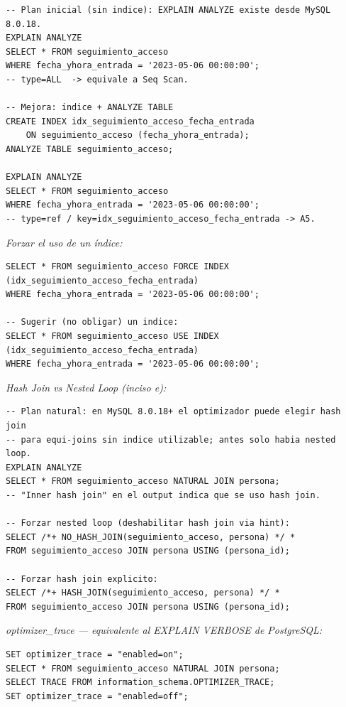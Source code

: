 \documentclass[11pt,a4paper]{article}
\begin{document}
\begin{lstlisting}
-- Plan inicial (sin indice): EXPLAIN ANALYZE existe desde MySQL 8.0.18.
EXPLAIN ANALYZE
SELECT * FROM seguimiento_acceso
WHERE fecha_yhora_entrada = '2023-05-06 00:00:00';
-- type=ALL  -> equivale a Seq Scan.

-- Mejora: indice + ANALYZE TABLE
CREATE INDEX idx_seguimiento_acceso_fecha_entrada
    ON seguimiento_acceso (fecha_yhora_entrada);
ANALYZE TABLE seguimiento_acceso;

EXPLAIN ANALYZE
SELECT * FROM seguimiento_acceso
WHERE fecha_yhora_entrada = '2023-05-06 00:00:00';
-- type=ref / key=idx_seguimiento_acceso_fecha_entrada -> A5.
\end{lstlisting}

\textit{Forzar el uso de un índice:}

\begin{lstlisting}
SELECT * FROM seguimiento_acceso FORCE INDEX (idx_seguimiento_acceso_fecha_entrada)
WHERE fecha_yhora_entrada = '2023-05-06 00:00:00';

-- Sugerir (no obligar) un indice:
SELECT * FROM seguimiento_acceso USE INDEX (idx_seguimiento_acceso_fecha_entrada)
WHERE fecha_yhora_entrada = '2023-05-06 00:00:00';
\end{lstlisting}

\textit{Hash Join vs Nested Loop (inciso e):}

\begin{lstlisting}
-- Plan natural: en MySQL 8.0.18+ el optimizador puede elegir hash join
-- para equi-joins sin indice utilizable; antes solo habia nested loop.
EXPLAIN ANALYZE
SELECT * FROM seguimiento_acceso NATURAL JOIN persona;
-- "Inner hash join" en el output indica que se uso hash join.

-- Forzar nested loop (deshabilitar hash join via hint):
SELECT /*+ NO_HASH_JOIN(seguimiento_acceso, persona) */ *
FROM seguimiento_acceso JOIN persona USING (persona_id);

-- Forzar hash join explicito:
SELECT /*+ HASH_JOIN(seguimiento_acceso, persona) */ *
FROM seguimiento_acceso JOIN persona USING (persona_id);
\end{lstlisting}

\textit{optimizer\_trace --- equivalente al EXPLAIN VERBOSE de PostgreSQL:}

\begin{lstlisting}
SET optimizer_trace = "enabled=on";
SELECT * FROM seguimiento_acceso NATURAL JOIN persona;
SELECT TRACE FROM information_schema.OPTIMIZER_TRACE;
SET optimizer_trace = "enabled=off";
\end{lstlisting}
\end{document}
